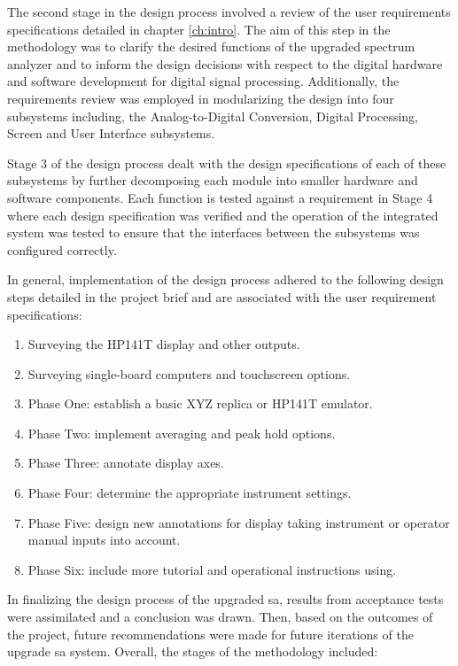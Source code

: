 \documentclass[class=report,11pt,crop=false]{standalone}
\begin{document}
	The second stage in the design process involved a review of the user requirements specifications detailed in chapter \ref{ch:intro}. The aim of this step in the methodology was to clarify the desired functions of the upgraded spectrum analyzer and to inform the design decisions with respect to the digital hardware and software development for digital signal processing. Additionally, the requirements review was employed in modularizing the design into four subsystems including, the Analog-to-Digital Conversion, Digital Processing, Screen and User Interface subsystems. 
		
	Stage 3 of the design process dealt with the design specifications of each of these subsystems by further decomposing each module into smaller hardware and software components. Each function is tested against a requirement in Stage 4 where each design specification was verified and the operation of the integrated system was tested to ensure that the interfaces between the subsystems was configured correctly. 
	
	In general, implementation of the design process adhered to the following design steps detailed in the project brief and are associated with the user requirement specifications:
	
	\begin{enumerate}
		\item 
		Surveying the HP141T display and other outputs.
		\item 
		Surveying single-board computers and touchscreen options.
		\item 
		Phase One: establish a basic XYZ replica or HP141T emulator.
		\item 
		Phase Two: implement averaging and peak hold options.
		\item 
		Phase Three: annotate display axes.
		\item 
		Phase Four: determine the appropriate instrument settings. 
		\item 
		Phase Five: design new annotations for display taking instrument or operator manual inputs into account.
		\item 
		Phase Six: include more tutorial and operational instructions using.
	\end{enumerate}
	
	In finalizing the design process of the upgraded \acrshort{sa}, results from acceptance tests were assimilated and a conclusion was drawn. Then, based on the outcomes of the project, future recommendations were made for future iterations of the upgrade \acrshort{sa} system. Overall, the stages of the methodology included:
	
\end{document}
